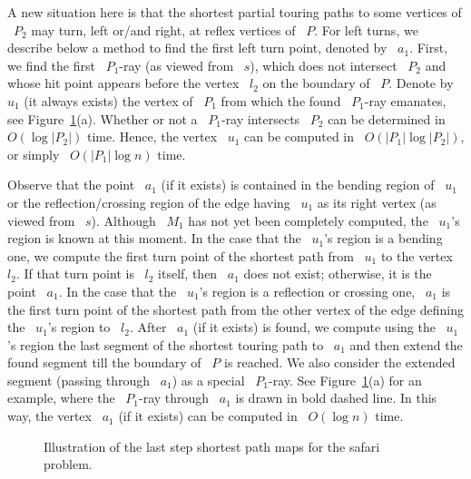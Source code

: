 \documentclass[11pt]{article}
\begin{document}
A new situation here is that the shortest partial touring paths to some vertices of ~\(P_2\) may turn, left or/and right, at reflex vertices of ~\(P\).
For left turns, we describe below a method to find the first left turn point, denoted by ~\(a_1\).
First, we find the first ~\(P_1\)-ray (as viewed from ~\(s\)), which does not intersect ~\(P_2\) and whose hit point appears before the vertex ~\(l_2\) on the boundary of ~\(P\).
Denote by ~\(u_1\) (it always exists) the vertex of ~\(P_1\) from which the found ~\(P_1\)-ray emanates, see Figure~\ref{fig:safarimaps}(a).
Whether or not a ~\(P_1\)-ray intersects ~\(P_2\) can be determined in ~\(O(\log|P_2|)\) time.
Hence, the vertex ~\(u_1\) can be computed in ~\(O(|P_1|\log|P_2|)\), or simply ~\(O(|P_1|\log n)\) time.

Observe that the point ~\(a_1\) (if it exists) is contained in the bending region of ~\(u_1\) or the reflection/crossing region of the edge having ~\(u_1\) as its right vertex (as viewed from ~\(s\)).
Although ~\(M_1\) has not yet been completely computed, the ~\(u_1\)'s region is known at this moment.
In the case that the ~\(u_1\)'s region is a bending one, we compute the first turn point of the shortest path from ~\(u_1\) to the vertex ~\(l_2\).
If that turn point is ~\(l_2\) itself, then ~\(a_1\) does not exist; otherwise, it is the point ~\(a_1\).
In the case that the ~\(u_1\)'s region is a reflection or crossing one, ~\(a_1\) is the first turn point of the shortest path from the other vertex of the edge defining the ~\(u_1\)'s region to ~\(l_2\).
After ~\(a_1\) (if it exists) is found, we compute using the ~\(u_1\)'s region the last segment of the shortest touring path to ~\(a_1\) and then extend the found segment till the boundary of ~\(P\) is reached.
We also consider the extended segment (passing through ~\(a_1\)) as a special ~\(P_1\)-ray.
See Figure~\ref{fig:safarimaps}(a) for an example, where the ~\(P_1\)-ray through ~\(a_1\) is drawn in bold dashed line.
In this way, the vertex ~\(a_1\) (if it exists) can be computed in ~\(O(\log n)\) time.

\begin{figure}[H]
	\centering
	\caption{Illustration of the last step shortest path maps for the safari problem.}
	\label{fig:safarimaps}
\end{figure}
\end{document}
